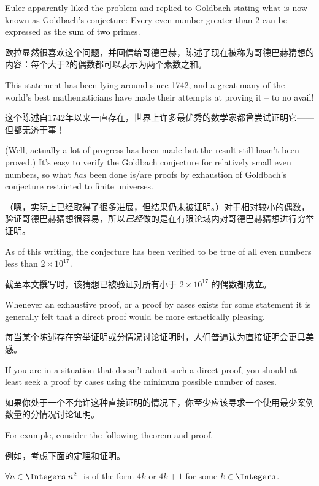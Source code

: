 Euler apparently liked the
problem and replied to Goldbach stating what is now known as Goldbach's
conjecture: Every even number greater than 2 can be expressed as the sum of
two primes.

欧拉显然很喜欢这个问题，并回信给哥德巴赫，陈述了现在被称为哥德巴赫猜想的内容：每个大于2的偶数都可以表示为两个素数之和。

This statement has been lying around since 1742, and a great
many of the world's best mathematicians have made their attempts at proving it
-- to no avail!

这个陈述自1742年以来一直存在，世界上许多最优秀的数学家都曾尝试证明它——但都无济于事！

(Well, actually a lot of progress has been made but the result
still hasn't been proved.)  It's easy to verify the Goldbach conjecture for
relatively small even numbers, so what \emph{has} been done is/are proofs by
exhaustion of Goldbach's conjecture restricted to finite universes.

（嗯，实际上已经取得了很多进展，但结果仍未被证明。）对于相对较小的偶数，验证哥德巴赫猜想很容易，所以\emph{已经}做的是在有限论域内对哥德巴赫猜想进行穷举证明。

As of this writing, the conjecture has been verified to be true of
all even numbers less than $2 \times 10^{17}$.

截至本文撰写时，该猜想已被验证对所有小于 $2 \times 10^{17}$ 的偶数都成立。

Whenever an exhaustive proof, or a proof by cases exists for some statement
it is generally felt that a direct proof would be more esthetically pleasing.

每当某个陈述存在穷举证明或分情况讨论证明时，人们普遍认为直接证明会更具美感。

If you are in a situation that doesn't admit such a direct proof, you should
at least seek a proof by cases using the minimum possible number of cases.

如果你处于一个不允许这种直接证明的情况下，你至少应该寻求一个使用最少案例数量的分情况讨论证明。

For example, consider the following theorem and proof.

例如，考虑下面的定理和证明。

\begin{thm} $\forall n \in \Integers \; n^2 \;$ is of the form $4k$ or
      $4k+1$ for some $k \in \Integers$.
\end{thm}

